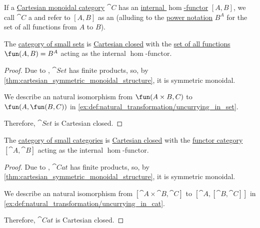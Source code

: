 \begin{definition}\label{def:cartesian_closed_category}
  If a \hyperref[def:cartesian_monoidal_category]{Cartesian monoidal category} \( \cat{C} \) has an \hyperref[def:closed_monoidal_category]{internal \( \hom \)-functor} \( [A, B] \), we call \( \cat{C} \) a  and refer to \( [A, B] \) as an  (alluding to the \hyperref[rem:set_of_functions_notation/power]{power notation} \( B^A \) for the set of all functions from \( A \) to \( B \)).
\end{definition}

\begin{proposition}\label{thm:category_of_small_sets_is_cartesian_closed}
  The \hyperref[def:category_of_small_sets]{category of small sets} is \hyperref[def:cartesian_closed_category]{Cartesian closed} with the \hyperref[def:set_of_all_functions]{set of all functions} \( \fun(A, B) = B^A \) acting as the internal \( \hom \)-functor.
\end{proposition}
\begin{proof}
  Due to , \( \cat{Set} \) has finite products, so, by \cref{thm:cartesian_symmetric_monoidal_structure}, it is symmetric monoidal.

  We describe an natural isomorphism from \( \fun(A \times B, C) \) to \( \fun(A, \fun(B, C)) \) in \cref{ex:def:natural_transformation/uncurrying_in_set}.

  Therefore, \( \cat{Set} \) is Cartesian closed.
\end{proof}

\begin{proposition}\label{thm:category_of_small_categories_is_cartesian_closed}
  The \hyperref[def:category_of_small_categories]{category of small categories} is \hyperref[def:cartesian_closed_category]{Cartesian closed} with the \hyperref[def:functor_category]{functor category} \( [\cat{A}, \cat{B}] \) acting as the internal \( \hom \)-functor.
\end{proposition}
\begin{proof}
  Due to , \( \cat{Cat} \) has finite products, so, by \cref{thm:cartesian_symmetric_monoidal_structure}, it is symmetric monoidal.

  We describe an natural isomorphism from \( [\cat{A} \times \cat{B}, \cat{C}] \) to \( [\cat{A}, [\cat{B}, \cat{C}]] \) in \cref{ex:def:natural_transformation/uncurrying_in_cat}.

  Therefore, \( \cat{Cat} \) is Cartesian closed.
\end{proof}

